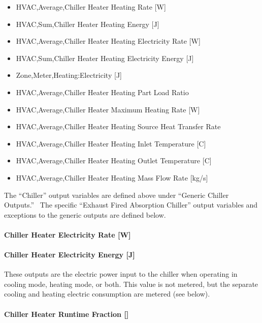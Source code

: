 \begin{itemize}
    \item
    HVAC,Average,Chiller Heater Heating Rate {[}W{]}
    \item
    HVAC,Sum,Chiller Heater Heating Energy {[}J{]}
    \item
    HVAC,Average,Chiller Heater Heating Electricity Rate {[}W{]}
    \item
    HVAC,Sum,Chiller Heater Heating Electricity Energy {[}J{]}
    \item
    Zone,Meter,Heating:Electricity {[}J{]}
    \item
    HVAC,Average,Chiller Heater Heating Part Load Ratio
    \item
    HVAC,Average,Chiller Heater Maximum Heating Rate {[}W{]}
    \item
    HVAC,Average,Chiller Heater Heating Source Heat Transfer Rate
    \item
    HVAC,Average,Chiller Heater Heating Inlet Temperature {[}C{]}
    \item
    HVAC,Average,Chiller Heater Heating Outlet Temperature {[}C{]}
    \item
    HVAC,Average,Chiller Heater Heating Mass Flow Rate {[}kg/s{]}
\end{itemize}

The ``Chiller'' output variables are defined above under ``Generic Chiller Outputs.''~ The specific ``Exhaust Fired Absorption Chiller'' output variables and exceptions to the generic outputs are defined below.

\paragraph{Chiller Heater Electricity Rate {[}W{]}}\label{chiller-heater-electric-power-w-1}

\paragraph{Chiller Heater Electricity Energy {[}J{]}}\label{chiller-heater-electric-energy-j-1}

These outputs are the electric power input to the chiller when operating in cooling mode, heating mode, or both. This value is not metered, but the separate cooling and heating electric consumption are metered (see below).

\paragraph{Chiller Heater Runtime Fraction {[]}}\label{chiller-heater-runtime-fraction-1}

